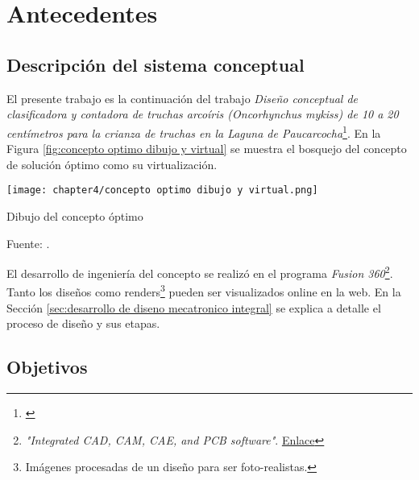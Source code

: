 
\pagestyle{myportland}
\doublespacing
\chapter[\quad\quad\quad\quad ----- Antecedentes]{\\ Antecedentes}
\thispagestyle{myportland}

\section{Descripción del sistema conceptual}
\label{sec:descripcion del sistema conceptual}

El presente trabajo es la continuación del trabajo \textit{Dise{\~{n}}o conceptual de clasificadora y contadora de truchas arco{\'{i}}ris (Oncorhynchus mykiss) de 10 a 20 cent{\'{i}}metros para la crianza de truchas en la Laguna de Paucarcocha}\footnote{\cite{DiazVergara2020}}. En la Figura \ref{fig:concepto optimo dibujo y virtual} se muestra el bosquejo del concepto de solución óptimo como su virtualización.

\begin{myfigure}[H]
	\centering
	\texttt{[image: chapter4/concepto optimo dibujo y virtual.png]}
	\caption{Dibujo del concepto óptimo}
	\begin{myflushcenter}
		Fuente: \cite{DiazVergara2020}.
	\end{myflushcenter}
	\label{fig:concepto optimo dibujo y virtual}
\end{myfigure}

El desarrollo de ingeniería del concepto se realizó en el programa \textit{Fusion 360}\footnote{\textit{"Integrated CAD, CAM, CAE, and PCB software"}. \href{https://www.autodesk.com/products/fusion-360/overview}{Enlace}}. Tanto los diseños como renders\footnote{Imágenes procesadas de un diseño para ser foto-realistas.} pueden ser visualizados online en la web. En la Sección \ref{sec:desarrollo de diseno mecatronico integral} se explica a detalle el proceso de diseño y sus etapas.

\section{Objetivos}

